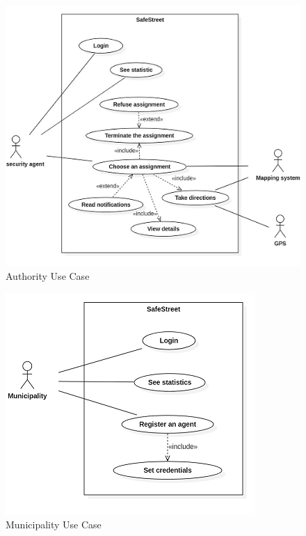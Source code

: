 \begin{figure}[h]
\centering
\includegraphics{Images/usecase_agent.png}
\caption{\label{fig:AUC}Authority Use Case }
\end{figure}
\begin{figure}[h]
\centering
\includegraphics{Images/usecase_municipality.png}
\caption{\label{fig:MUC}Municipality Use Case }
\end{figure}
